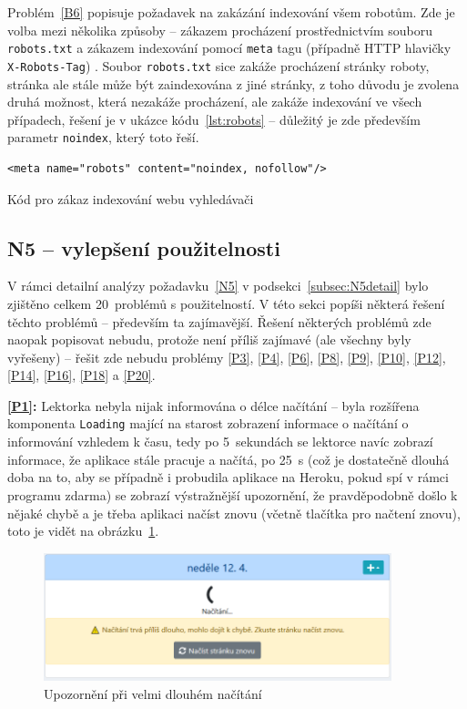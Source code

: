 Problém~\ref{B6} popisuje požadavek na zakázání indexování všem robotům. Zde je volba mezi několika způsoby -- zákazem procházení prostřednictvím souboru \verb|robots.txt| a zákazem indexování pomocí \verb|meta| tagu (případně HTTP hlavičky \verb|X-Robots-Tag|) \cite{roboti}. Soubor \verb|robots.txt| sice zakáže procházení stránky roboty, stránka ale stále může být zaindexována z jiné stránky, z toho důvodu je zvolena druhá možnost, která nezakáže procházení, ale zakáže indexování ve všech případech, řešení je v ukázce kódu~\ref{lst:robots} -- důležitý je zde především parametr \verb|noindex|, který toto řeší. 

\begin{listing}[ht]
	\begin{verbatim}
<meta name="robots" content="noindex, nofollow"/>
	\end{verbatim}
	\caption{Kód pro zákaz indexování webu vyhledávači}\label{lst:robots}
\end{listing}

\subsection{N5 -- vylepšení použitelnosti}

V rámci detailní analýzy požadavku~\ref{N5} v podsekci~\ref{subsec:N5detail} bylo zjištěno celkem 20~problémů s použitelností. V této sekci popíši některá řešení těchto problémů -- především ta zajímavější. Řešení některých problémů zde naopak popisovat nebudu, protože není příliš zajímavé (ale všechny byly vyřešeny) -- řešit zde nebudu problémy \ref{P3}, \ref{P4}, \ref{P6}, \ref{P8}, \ref{P9}, \ref{P10}, \ref{P12}, \ref{P14}, \ref{P16}, \ref{P18} a \ref{P20}.
 
\textbf{\ref{P1}:} Lektorka nebyla nijak informována o délce načítání -- byla rozšířena komponenta \verb|Loading| mající na starost zobrazení informace o načítání o informování vzhledem k času, tedy po 5~sekundách se lektorce navíc zobrazí informace, že aplikace stále pracuje a načítá, po 25~s (což je dostatečně dlouhá doba na to, aby se případně i probudila aplikace na Heroku, pokud spí v rámci programu zdarma) se zobrazí výstražnější upozornění, že pravděpodobně došlo k nějaké chybě a je třeba aplikaci načíst znovu (včetně tlačítka pro načtení znovu), toto je vidět na obrázku~\ref{fig:ui-screen-loading}.

\begin{figure}[h]\centering
    \includegraphics[width=0.9\textwidth]{img/ui-screen-loading.png}
    \caption{Upozornění při velmi dlouhém načítání}\label{fig:ui-screen-loading}
\end{figure}

